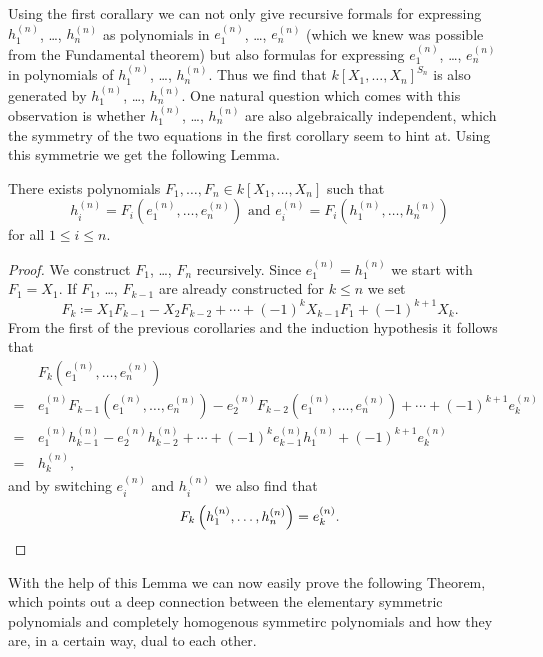 Using the first corallary we can not only give recursive formals for expressing $h^{(n)}_1$, \dots, $h^{(n)}_n$ as polynomials in $e^{(n)}_1$, \dots, $e^{(n)}_n$ (which we knew was possible from the Fundamental theorem) but also formulas for expressing $e^{(n)}_1$, \dots, $e^{(n)}_n$ in polynomials of $h^{(n)}_1$, \dots, $h^{(n)}_n$. Thus we find that $k[X_1, \dotsc, X_n]^{S_n}$ is also generated by $h^{(n)}_1$, \dots, $h^{(n)}_n$. One natural question which comes with this observation is whether $h^{(n)}_1$, \dots, $h^{(n)}_n$ are also algebraically independent, which the symmetry of the two equations in the first corollary seem to hint at. Using this symmetrie we get the following Lemma.


\begin{lem}
 There exists polynomials $F_1, \dotsc, F_n \in k[X_1, \dotsc, X_n]$ such that
 \[
  h^{(n)}_i = F_i\left(e^{(n)}_1, \dotsc, e^{(n)}_n\right) \text{ and }
  e^{(n)}_i = F_i\left(h^{(n)}_1, \dotsc, h^{(n)}_n\right)
 \]
 for all $1 \leq i \leq n$.
\end{lem}
\begin{proof}
 We construct $F_1$, \dots, $F_n$ recursively. Since $e^{(n)}_1 = h^{(n)}_1$ we start with $F_1 = X_1$. If $F_1$, \dots, $F_{k-1}$ are already constructed for $k \leq n$ we set
 \[
  F_k \coloneqq X_1 F_{k-1} - X_2 F_{k-2} + \dotsb + (-1)^k X_{k-1} F_1 + (-1)^{k+1} X_k.
 \]
 From the first of the previous corollaries and the induction hypothesis it follows that
 \begin{align*}
   &\, F_k\left(e^{(n)}_1, \dotsc, e^{(n)}_n\right) \\
  =&\, e^{(n)}_1 F_{k-1}\left(e^{(n)}_1, \dotsc, e^{(n)}_n\right) - e^{(n)}_2 F_{k-2}\left(e^{(n)}_1, \dotsc, e^{(n)}_n\right) + \dotsb + (-1)^{k+1} e^{(n)}_k \\
  =&\, e^{(n)}_1 h^{(n)}_{k-1} - e^{(n)}_2 h^{(n)}_{k-2} + \dotsb + (-1)^k e^{(n)}_{k-1} h^{(n)}_1 + (-1)^{k+1} e^{(n)}_k \\
  =&\, h^{(n)}_k,
 \end{align*}
 and by switching $e^{(n)}_i$ and $h^{(n)}_i$ we also find that
 \[
  F_k\left(h^{(n)}_1, \dotsc, h^{(n)}_n\right) = e^{(n)}_k.
  \qedhere
 \]
\end{proof}


With the help of this Lemma we can now easily prove the following Theorem, which points out a deep connection between the elementary symmetric polynomials and completely homogenous symmetirc polynomials and how they are, in a certain way, dual to each other.


